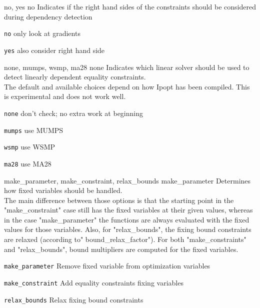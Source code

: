 %
{\ttfamily no, yes}%
{no}%
{Indicates if the right hand sides of the constraints should be considered during dependency detection}%
{\begin{list}{}{
\setlength{\parsep}{0em}
\setlength{\leftmargin}{5ex}
\setlength{\labelwidth}{2ex}
\setlength{\itemindent}{0ex}
\setlength{\topsep}{0pt}}
\item[\texttt{no}] only look at gradients
\item[\texttt{yes}] also consider right hand side
\end{list}
}

%
{\ttfamily none, mumps, wsmp, ma28}%
{none}%
{Indicates which linear solver should be used to detect linearly dependent equality constraints.\\
The default and available choices depend on how Ipopt has been compiled.  This is experimental and does not work well.}%
{\begin{list}{}{
\setlength{\parsep}{0em}
\setlength{\leftmargin}{5ex}
\setlength{\labelwidth}{2ex}
\setlength{\itemindent}{0ex}
\setlength{\topsep}{0pt}}
\item[\texttt{none}] don't check; no extra work at beginning
\item[\texttt{mumps}] use MUMPS
\item[\texttt{wsmp}] use WSMP
\item[\texttt{ma28}] use MA28
\end{list}
}

%
{\ttfamily make\_parameter, make\_constraint, relax\_bounds}%
{make\_parameter}%
{Determines how fixed variables should be handled.\\
The main difference between those options is that the starting point in the "make\_constraint" case still has the fixed variables at their given values, whereas in the case "make\_parameter" the functions are always evaluated with the fixed values for those variables.  Also, for "relax\_bounds", the fixing bound constraints are relaxed (according to" bound\_relax\_factor"). For both "make\_constraints" and "relax\_bounds", bound multipliers are computed for the fixed variables.}%
{\begin{list}{}{
\setlength{\parsep}{0em}
\setlength{\leftmargin}{5ex}
\setlength{\labelwidth}{2ex}
\setlength{\itemindent}{0ex}
\setlength{\topsep}{0pt}}
\item[\texttt{make\_parameter}] Remove fixed variable from optimization variables
\item[\texttt{make\_constraint}] Add equality constraints fixing variables
\item[\texttt{relax\_bounds}] Relax fixing bound constraints
\end{list}
}

